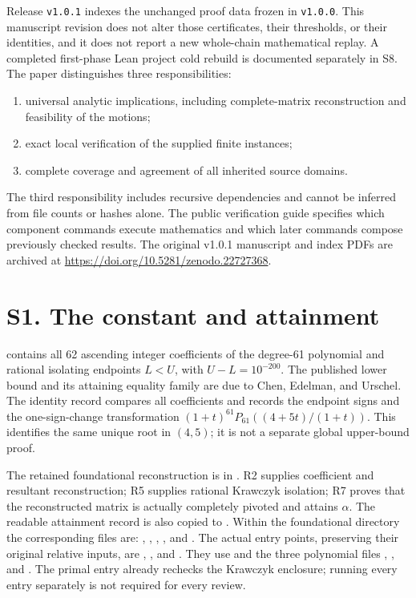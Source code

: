 \documentclass[10pt]{article}
\begin{document}
Release \texttt{v1.0.1} indexes the unchanged proof data frozen in \texttt{v1.0.0}.
This manuscript revision does not alter those certificates, their
thresholds, or their identities, and it does not report a new
whole-chain mathematical replay. A completed first-phase Lean project
cold rebuild is documented separately in S8. The paper distinguishes
three responsibilities:
\begin{enumerate}
\item universal analytic implications, including complete-matrix
reconstruction and feasibility of the motions;
\item exact local verification of the supplied finite instances;
\item complete coverage and agreement of all inherited source domains.
\end{enumerate}
The third responsibility includes recursive dependencies and cannot be
inferred from file counts or hashes alone. The public verification guide
specifies which component commands execute mathematics and which later
commands compose previously checked results.
The original v1.0.1 manuscript and index PDFs are archived at
\url{https://doi.org/10.5281/zenodo.22727368}.

\section*{S1. The constant and attainment}

 contains all 62 ascending integer
coefficients of the degree-61 polynomial and rational isolating endpoints
\(L<U\), with \(U-L=10^{-200}\). The published lower bound and its
attaining equality family are due to Chen, Edelman, and Urschel.
The identity record 
compares all coefficients and records the endpoint signs and the
one-sign-change transformation
\((1+t)^{61}P_{61}((4+5t)/(1+t))\). This identifies the same unique
root in \((4,5)\); it is not a separate global upper-bound proof.

The retained foundational reconstruction is in
. R2 supplies coefficient and resultant
reconstruction; R5 supplies rational Krawczyk isolation; R7 proves that
the reconstructed matrix is actually completely pivoted and attains
\(\alpha\). The readable attainment record is also copied to
.
Within the foundational directory the corresponding files are:
,
,
,
, and
.
The actual entry points, preserving their original relative inputs, are
,
, and
.
They use  and the three polynomial
files ,
, and .
The primal entry already rechecks the Krawczyk enclosure; running every
entry separately is not required for every review.
\end{document}
